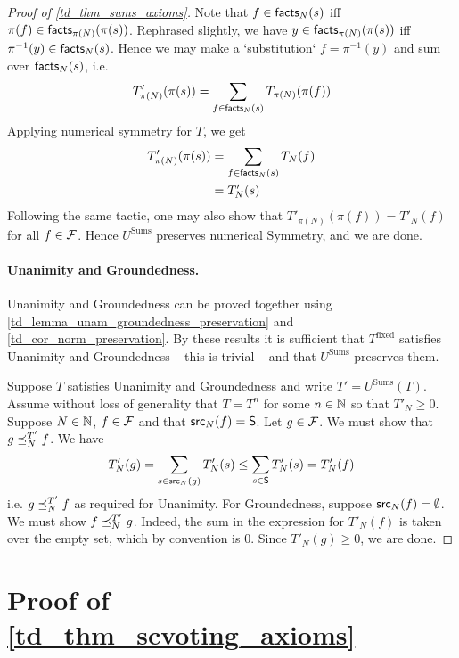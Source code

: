 \begin{proof}[Proof of \cref{td_thm_sums_axioms}]
Note that $f \in \mathsf{facts}_N(s)$ iff $\pi(f) \in \mathsf{facts}_{\pi(N)}(\pi(s))$.
Rephrased slightly, we have $y \in \mathsf{facts}_{\pi(N)}(\pi(s))$ iff $\pi^{-1}(y)
\in \mathsf{facts}_N(s)$. Hence we may make a `substitution` $f = \pi^{-1}(y)$ and sum
over $\mathsf{facts}_N(s)$, i.e.
\[
    T'_{\pi(N)}(\pi(s))
    = \sum_{f \in \mathsf{facts}_N(s)}{T_{\pi(N)}(\pi(f))}
\]
Applying numerical symmetry for $T$, we get
\begin{align*}
    T'_{\pi(N)}(\pi(s))
    &= \sum_{f \in \mathsf{facts}_N(s)}{T_N(f)} \\
    &= T'_N(s)
\end{align*}
Following the same tactic, one may also show that $T'_{\pi(N)}(\pi(f)) =
T'_N(f)$ for all $f \in \mathcal{F}$. Hence $U^{\text{Sums}}$ preserves numerical
Symmetry, and we are done.

\paragraph{Unanimity and Groundedness.}

Unanimity and Groundedness can be proved together using
\cref{td_lemma_unam_groundedness_preservation} and \cref{td_cor_norm_preservation}.
By these results it is sufficient that $T^{\text{fixed}}$ satisfies Unanimity
and Groundedness -- this is trivial -- and that $U^{\text{Sums}}$ preserves
them.

Suppose $T$ satisfies Unanimity and Groundedness and write $T' =
U^{\text{Sums}}(T)$. Assume without loss of generality that $T = T^n$ for some
$n \in \mathbb{N}$ so that $T'_N \ge 0$. Suppose $N \in \mathbb{N}$, $f \in \mathcal{F}$ and that
$\mathsf{src}_N(f) = \mathsf{S}$. Let $g \in \mathcal{F}$. We must show that $g \preceq_N^{T'} f$. We have
\[ T'_N(g) = \sum_{s \in \mathsf{src}_N(g)}{T'_N(s)} \le \sum_{s \in \mathsf{S}}{T'_N(s)} =
T'_N(f) \] i.e. $g \preceq_N^{T'} f$ as required for Unanimity. For Groundedness,
suppose $\mathsf{src}_N(f) = \emptyset$. We must show $f \preceq_N^{T'} g$. Indeed, the
sum in the expression for $T'_N(f)$ is taken over the empty set, which by
convention is 0.  Since $T'_N(g) \ge 0$, we are done.
\end{proof}

\section{Proof of \cref{td_thm_scvoting_axioms}}

